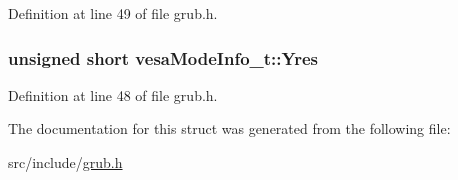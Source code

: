 Definition at line 49 of file grub.\+h.

\hypertarget{structvesaModeInfo__t_a54003f0083b0581fc14babfec48a1d7d}{
\subsubsection[{Yres}]{\setlength{\rightskip}{0pt plus 5cm}unsigned short vesa\+Mode\+Info\+\_\+t\+::\+Yres}}\label{structvesaModeInfo__t_a54003f0083b0581fc14babfec48a1d7d}


Definition at line 48 of file grub.\+h.



The documentation for this struct was generated from the following file\+:\begin{DoxyCompactItemize}
\item 
src/include/\hyperlink{grub_8h}{grub.\+h}\end{DoxyCompactItemize}
